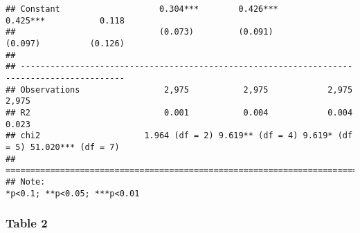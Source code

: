 \documentclass[
]{article}
\begin{document}
\begin{verbatim}
## Constant                    0.304***        0.426***        0.425***           0.118       
##                             (0.073)         (0.091)          (0.097)          (0.126)      
##                                                                                            
## -------------------------------------------------------------------------------------------
## Observations                 2,975           2,975            2,975            2,975       
## R2                           0.001           0.004            0.004            0.023       
## chi2                     1.964 (df = 2) 9.619** (df = 4) 9.619* (df = 5) 51.020*** (df = 7)
## ===========================================================================================
## Note:                                                           *p<0.1; **p<0.05; ***p<0.01
\end{verbatim}

\hypertarget{table-2}{%
\subsubsection{Table 2}\label{table-2}}
\end{document}
